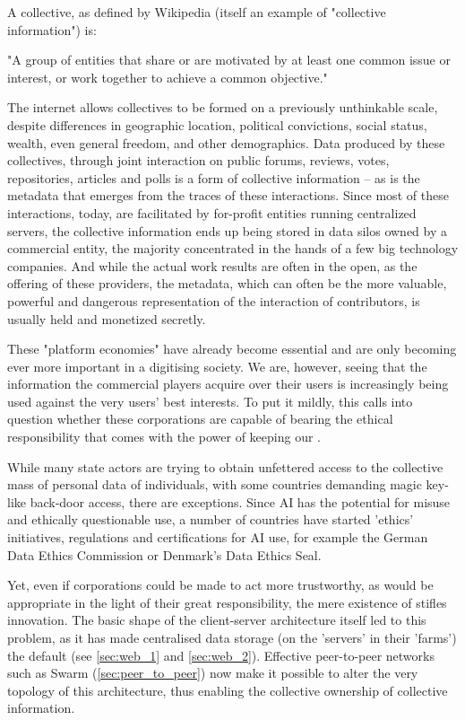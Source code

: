 A collective, as defined by Wikipedia (itself an example of "collective information") is:
\begin{displayquote}
"A group of entities that share or are motivated by at least one common issue or interest, or work together to achieve a common objective." 
\end{displayquote}
The internet allows collectives to be formed on a previously unthinkable scale, despite differences in geographic location, political convictions, social status, wealth, even general freedom, and other demographics. Data produced by these collectives, through joint interaction on public forums, reviews, votes, repositories, articles and polls is a form of collective information – as is the metadata that emerges from the traces of these interactions. Since most of these interactions, today, are facilitated by for-profit entities running centralized servers, the collective information ends up being stored in data silos owned by a commercial entity, the majority concentrated in the hands of a few big technology companies. And while the actual work results are often in the open, as the offering of these providers, the metadata, which can often be the more valuable, powerful and dangerous representation of the interaction of contributors, is usually held and monetized secretly.

These "platform economies" have already become essential and are only becoming ever more important in a digitising society. We are, however, seeing that the information the commercial players acquire over their users is increasingly being used against the very users' best interests. To put it mildly, this calls into question whether these corporations are capable of bearing the ethical responsibility that comes with the power of keeping our .

While many state actors are trying to obtain unfettered access to the collective mass of personal data of individuals, with some countries demanding magic key-like back-door access, there are exceptions. Since AI has the potential for misuse and ethically questionable use, a number of countries have started 'ethics' initiatives, regulations and certifications for AI use, for example the German Data Ethics Commission or Denmark's Data Ethics Seal. 

Yet, even if corporations could be made to act more trustworthy, as would be appropriate in the light of their great responsibility, the mere existence of  stifles innovation. The basic shape of the client-server architecture itself  led to this problem, as it has made centralised data storage (on the 'servers' in their 'farms') the default (see \ref{sec:web_1} and \ref{sec:web_2}). Effective peer-to-peer networks such as Swarm (\ref{sec:peer_to_peer}) now make it possible to alter the very topology of this architecture, thus enabling the collective ownership of collective information. 


